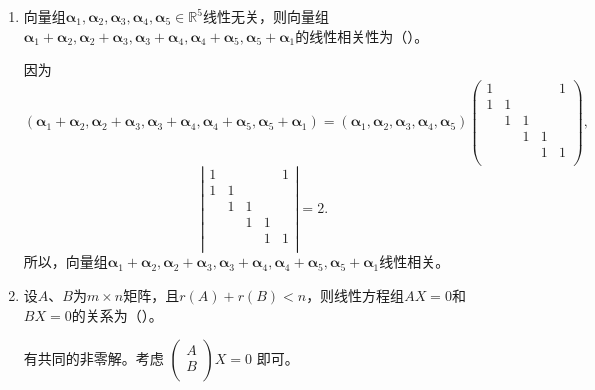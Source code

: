 \begin{enumerate}[1~]
\begin{enumerate}[1.~]
\item
向量组$\boldsymbol{\alpha} _ { 1 } , \boldsymbol{\alpha} _ { 2 } , \boldsymbol{\alpha} _ { 3 } , \boldsymbol{\alpha} _ { 4 } , \boldsymbol{\alpha} _ { 5 } \in \mathbb{R} ^ { 5 }$线性无关，则向量组$\boldsymbol{\alpha} _ { 1 } + \boldsymbol{\alpha} _ { 2 } , \boldsymbol{\alpha} _ { 2 } + \boldsymbol{\alpha} _ { 3 } , \boldsymbol{\alpha} _ { 3 } + \boldsymbol{\alpha} _ { 4 } ,  \boldsymbol{\alpha} _ { 4 } + \boldsymbol{\alpha} _ { 5 },  \boldsymbol{\alpha} _ { 5 } + \boldsymbol{\alpha} _ { 1 }$的线性相关性为（\quad）。
\begin{solution}
因为\[
(\boldsymbol{\alpha} _ { 1 } + \boldsymbol{\alpha} _ { 2 } , \boldsymbol{\alpha} _ { 2 } + \boldsymbol{\alpha} _ { 3 } , \boldsymbol{\alpha} _ { 3 } + \boldsymbol{\alpha} _ { 4 } ,  \boldsymbol{\alpha} _ { 4 } + \boldsymbol{\alpha} _ { 5 },  \boldsymbol{\alpha} _ { 5 } + \boldsymbol{\alpha} _ { 1 })=(\boldsymbol{\alpha} _ { 1 } , \boldsymbol{\alpha} _ { 2 } , \boldsymbol{\alpha} _ { 3 } , \boldsymbol{\alpha} _ { 4 } , \boldsymbol{\alpha} _ { 5 })\left( \begin{matrix}
	1&		&		&		&		1\\
	1&		1&		&		&		\\
	&		1&		1&		&		\\
	&		&		1&		1&		\\
	&		&		&		1&		1\\
\end{matrix} \right) ,
\]
\[
\left| \begin{matrix}
	1&		&		&		&		1\\
	1&		1&		&		&		\\
	&		1&		1&		&		\\
	&		&		1&		1&		\\
	&		&		&		1&		1\\
\end{matrix} \right|=2.
\]
所以，向量组$\boldsymbol{\alpha} _ { 1 } + \boldsymbol{\alpha} _ { 2 } , \boldsymbol{\alpha} _ { 2 } + \boldsymbol{\alpha} _ { 3 } , \boldsymbol{\alpha} _ { 3 } + \boldsymbol{\alpha} _ { 4 } ,  \boldsymbol{\alpha} _ { 4 } + \boldsymbol{\alpha} _ { 5 },  \boldsymbol{\alpha} _ { 5 } + \boldsymbol{\alpha} _ { 1 }$线性相关。
\end{solution}

\item
设$A$、$B$为$m\times n$矩阵，且${ r}(A)+{ r}(B)<n$，则线性方程组$AX =0$和$BX=0$的关系为（\quad）。
\begin{solution}
有共同的非零解。考虑 $\left( \begin{smallmatrix}
	A\\
	B\\
\end{smallmatrix} \right) X=0$ 即可。
\end{solution}


\end{enumerate}
\end{enumerate}
